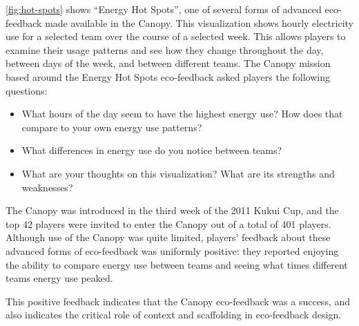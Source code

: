 \documentclass{sigchi}
\begin{document}
\autoref{fig:hot-spots} shows ``Energy Hot Spots'', one of several forms of advanced eco-feedback made available in the Canopy. This visualization shows hourly electricity use for a selected team over the course of a selected week. This allows players to examine their usage patterns and see how they change throughout the day, between days of the week, and between different teams. The Canopy mission based around the Energy Hot Spots eco-feedback asked players the following questions:

\begin{itemize}
	\item What hours of the day seem to have the highest energy use? How does that compare to your own energy use patterns?
	\item What differences in energy use do you notice between teams?
	\item What are your thoughts on this visualization? What are its strengths and weaknesses?
\end{itemize}

The Canopy was introduced in the third week of the 2011 Kukui Cup, and the top 42 players were invited to enter the Canopy out of a total of 401 players.  Although use of the Canopy was quite limited, players' feedback about these advanced forms of eco-feedback was uniformly positive: they reported enjoying the ability to compare energy use between teams and seeing what times different teams energy use peaked. 

This positive feedback indicates that the Canopy eco-feedback was a success, and also indicates the critical role of context and scaffolding in eco-feedback design.  



\end{document}

